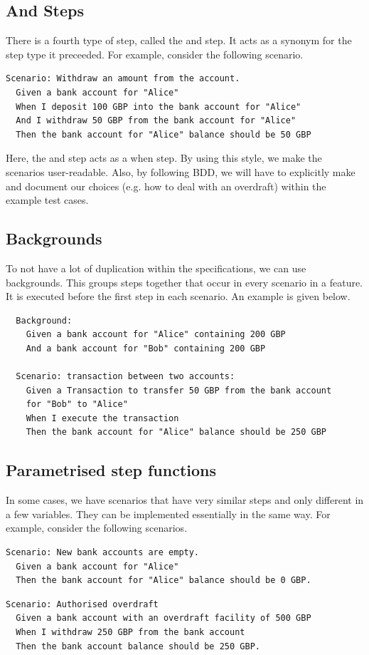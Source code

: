 \documentclass[a4paper, openany]{memoir}
\begin{document}
\subsection{And Steps}
There is a fourth type of step, called the and step. It acts as a synonym for the step type it preceeded. For example, consider the following scenario.
\begin{verbatim}
Scenario: Withdraw an amount from the account.
  Given a bank account for "Alice"
  When I deposit 100 GBP into the bank account for "Alice"
  And I withdraw 50 GBP from the bank account for "Alice"
  Then the bank account for "Alice" balance should be 50 GBP
\end{verbatim}
Here, the and step acts as a when step. By using this style, we make the scenarios user-readable. Also, by following BDD, we will have to explicitly make and document our choices (e.g. how to deal with an overdraft) within the example test cases.

\subsection{Backgrounds}
To not have a lot of duplication within the specifications, we can use backgrounds. This groups steps together that occur in every scenario in a feature. It is executed before the first step in each scenario. An example is given below.
\begin{verbatim}
  Background:
    Given a bank account for "Alice" containing 200 GBP
    And a bank account for "Bob" containing 200 GBP

  Scenario: transaction between two accounts:
    Given a Transaction to transfer 50 GBP from the bank account 
    for "Bob" to "Alice"
    When I execute the transaction
    Then the bank account for "Alice" balance should be 250 GBP
\end{verbatim}

\subsection{Parametrised step functions}
In some cases, we have scenarios that have very similar steps and only different in a few variables. They can be implemented essentially in the same way. For example, consider the following scenarios.
\begin{verbatim}
Scenario: New bank accounts are empty.
  Given a bank account for "Alice"
  Then the bank account for "Alice" balance should be 0 GBP.
\end{verbatim}
\begin{verbatim}
Scenario: Authorised overdraft
  Given a bank account with an overdraft facility of 500 GBP
  When I withdraw 250 GBP from the bank account
  Then the bank account balance should be 250 GBP.
\end{verbatim}
\end{document}
